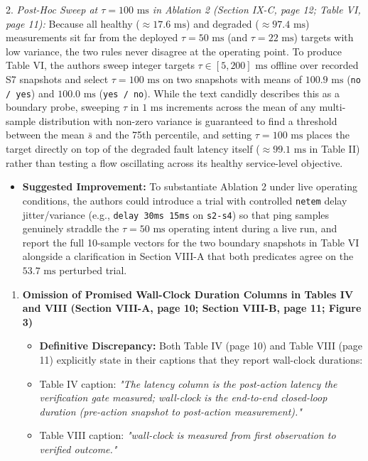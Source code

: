 \documentclass[11pt,a4paper]{article}
\begin{document}
2. \emph{Post-Hoc Sweep at $\tau = 100\text{ ms}$ in Ablation 2 (Section IX-C, page 12; Table VI, page 11):} Because all healthy ($\approx 17.6\text{ ms}$) and degraded ($\approx 97.4\text{ ms}$) measurements sit far from the deployed $\tau = 50\text{ ms}$ (and $\tau = 22\text{ ms}$) targets with low variance, the two rules never disagree at the operating point. To produce Table VI, the authors sweep integer targets $\tau \in [5, 200]\text{ ms}$ offline over recorded S7 snapshots and select $\tau = 100\text{ ms}$ on two snapshots with means of $100.9\text{ ms}$ (\texttt{no / yes}) and $100.0\text{ ms}$ (\texttt{yes / no}). While the text candidly describes this as a boundary probe, sweeping $\tau$ in $1\text{ ms}$ increments across the mean of any multi-sample distribution with non-zero variance is guaranteed to find a threshold between the mean $\bar{s}$ and the 75th percentile, and setting $\tau = 100\text{ ms}$ places the target directly on top of the degraded fault latency itself ($\approx 99.1\text{ ms}$ in Table II) rather than testing a flow oscillating across its healthy service-level objective.
\begin{itemize}[leftmargin=1.8em,itemsep=2pt]
\item \textbf{Suggested Improvement:} To substantiate Ablation 2 under live operating conditions, the authors could introduce a trial with controlled \texttt{netem} delay jitter/variance (e.g., \texttt{delay 30ms 15ms} on \texttt{s2-s4}) so that ping samples genuinely straddle the $\tau = 50\text{ ms}$ operating intent during a live run, and report the full 10-sample vectors for the two boundary snapshots in Table VI alongside a clarification in Section VIII-A that both predicates agree on the $53.7\text{ ms}$ perturbed trial.
\end{itemize}
\begin{enumerate}[leftmargin=1.6em,itemsep=3pt]
\item \textbf{Omission of Promised Wall-Clock Duration Columns in Tables IV and VIII (Section VIII-A, page 10; Section VIII-B, page 11; Figure 3)}
\begin{itemize}[leftmargin=1.8em,itemsep=2pt]
\item \textbf{Definitive Discrepancy:} Both Table IV (page 10) and Table VIII (page 11) explicitly state in their captions that they report wall-clock durations:
\item Table IV caption: \emph{"The latency column is the post-action latency the verification gate measured; wall-clock is the end-to-end closed-loop duration (pre-action snapshot to post-action measurement)."}
\item Table VIII caption: \emph{"wall-clock is measured from first observation to verified outcome."}
\end{itemize}
\end{enumerate}
\end{document}
